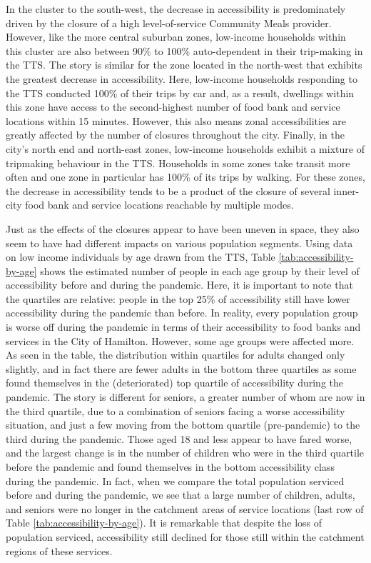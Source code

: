 \documentclass[]{elsarticle} %
\begin{document}
In the cluster to the south-west, the decrease in accessibility is
predominately driven by the closure of a high level-of-service Community
Meals provider. However, like the more central suburban zones,
low-income households within this cluster are also between 90\% to 100\%
auto-dependent in their trip-making in the TTS. The story is similar for
the zone located in the north-west that exhibits the greatest decrease
in accessibility. Here, low-income households responding to the TTS
conducted 100\% of their trips by car and, as a result, dwellings within
this zone have access to the second-highest number of food bank and
service locations within 15 minutes. However, this also means zonal
accessibilities are greatly affected by the number of closures
throughout the city. Finally, in the city's north end and north-east
zones, low-income households exhibit a mixture of tripmaking behaviour
in the TTS. Households in some zones take transit more often and one
zone in particular has 100\% of its trips by walking. For these zones,
the decrease in accessibility tends to be a product of the closure of
several inner-city food bank and service locations reachable by multiple
modes.

Just as the effects of the closures appear to have been uneven in space,
they also seem to have had different impacts on various population
segments. Using data on low income individuals by age drawn from the
TTS, Table \ref{tab:accessibility-by-age} shows the estimated number of
people in each age group by their level of accessibility before and
during the pandemic. Here, it is important to note that the quartiles
are relative: people in the top 25\% of accessibility still have lower
accessibility during the pandemic than before. In reality, every
population group is worse off during the pandemic in terms of their
accessibility to food banks and services in the City of Hamilton.
However, some age groups were affected more. As seen in the table, the
distribution within quartiles for adults changed only slightly, and in
fact there are fewer adults in the bottom three quartiles as some found
themselves in the (deteriorated) top quartile of accessibility during
the pandemic. The story is different for seniors, a greater number of
whom are now in the third quartile, due to a combination of seniors
facing a worse accessibility situation, and just a few moving from the
bottom quartile (pre-pandemic) to the third during the pandemic. Those
aged 18 and less appear to have fared worse, and the largest change is
in the number of children who were in the third quartile before the
pandemic and found themselves in the bottom accessibility class during
the pandemic. In fact, when we compare the total population serviced
before and during the pandemic, we see that a large number of children,
adults, and seniors were no longer in the catchment areas of service
locations (last row of Table \ref{tab:accessibility-by-age}). It is
remarkable that despite the loss of population serviced, accessibility
still declined for those still within the catchment regions of these
services.
\end{document}
